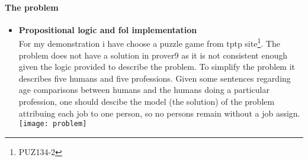\paragraph{The problem}
\begin{itemize}
\item{\textbf{Propositional logic and fol implementation}}\\
	\tab For my demonstration i have choose a puzzle game from tptp site\footnote{PUZ134-2}. The problem does not have a solution in prover9 as it is not consistent enough given the logic provided to describe the problem. To simplify the problem it describes five humans and five professions. Given some sentences regarding  age comparisons between humans and the humans doing a particular profession, one should descibe the model (the solution) of the problem attribuing each job to one person, so no persons remain without a job assign.\\
\texttt{[image: problem]}


\end{itemize}

